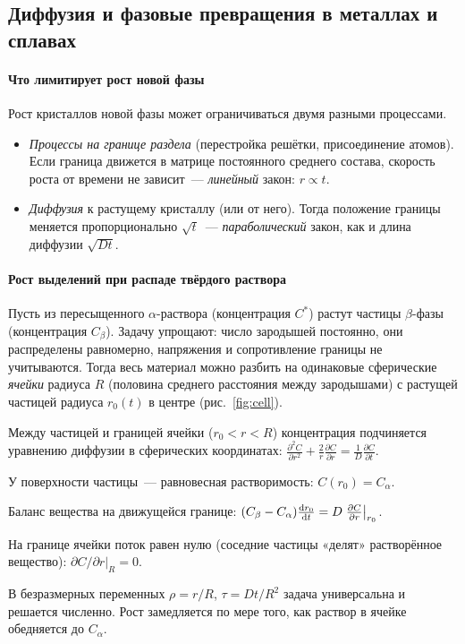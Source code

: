 \subsection{Диффузия и фазовые превращения в металлах и сплавах}\label{ssec:diff-phase}

\paragraph{Что лимитирует рост новой фазы}
Рост кристаллов новой фазы может ограничиваться двумя разными
процессами.
\begin{itemize}
\item \emph{Процессы на границе раздела} (перестройка решётки,
присоединение атомов). Если граница движется в матрице постоянного
среднего состава, скорость роста от времени не зависит~— \emph{линейный}
закон: $r\propto t$.
\item \emph{Диффузия} к растущему кристаллу (или от него). Тогда
положение границы меняется пропорционально $\sqrt t$~—
\emph{параболический} закон, как и длина диффузии $\sqrt{Dt}$.
\end{itemize}

\paragraph{Рост выделений при распаде твёрдого раствора}
Пусть из пересыщенного $\alpha$-раствора (концентрация $C^*$) растут
частицы $\beta$-фазы (концентрация $C_\beta$). Задачу упрощают:
число зародышей постоянно, они распределены равномерно, напряжения и
сопротивление границы не учитываются. Тогда весь материал можно
разбить на одинаковые сферические \emph{ячейки} радиуса $R$ (половина
среднего расстояния между зародышами) с растущей частицей радиуса
$r_0(t)$ в центре (рис.~\ref{fig:cell}).
\begin{shagi}
\item Между частицей и границей ячейки ($r_0<r<R$) концентрация
подчиняется уравнению диффузии в сферических координатах:
$\frac{\partial^2C}{\partial r^2}+\frac2r\frac{\partial C}{\partial r}=\frac1D\frac{\partial C}{\partial t}$.
\item У поверхности частицы~— равновесная растворимость: $C(r_0)=C_\alpha$.
\item Баланс вещества на движущейся границе:
$(C_\beta-C_\alpha)\frac{\mathop{}\!\mathrm{d} r_0}{\mathop{}\!\mathrm{d} t}=D\left.\frac{\partial C}{\partial r}\right|_{r_0}$.
\item На границе ячейки поток равен нулю (соседние частицы
«делят» растворённое вещество): $\partial C/\partial r|_R=0$.
\end{shagi}
В безразмерных переменных $\rho=r/R$, $\tau=Dt/R^2$ задача
универсальна и решается численно. Рост замедляется по мере того, как
раствор в ячейке обедняется до $C_\alpha$.

